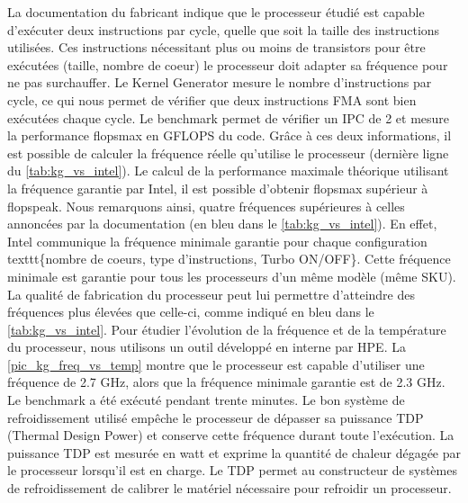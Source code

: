     

    
    La documentation du fabricant indique que le processeur étudié est capable d'exécuter deux instructions par cycle, quelle que soit la taille des instructions utilisées. Ces instructions nécessitant plus ou moins de transistors pour être exécutées (taille, nombre de coeur) le processeur doit adapter sa fréquence pour ne pas surchauffer.  Le Kernel Generator mesure le nombre d'instructions par cycle, ce qui nous permet de vérifier que deux instructions \gls{FMA} sont bien exécutées chaque cycle. Le benchmark permet de vérifier un \gls{IPC} de 2 et mesure la performance \gls{flopsmax} en GFLOPS du code. Grâce à ces deux informations, il est possible de calculer la fréquence réelle qu'utilise le processeur (dernière ligne du  \autoref{tab:kg_vs_intel}). Le calcul de la performance maximale théorique utilisant la fréquence garantie par Intel, il est possible d'obtenir \gls{flopsmax} supérieur à \gls{flopspeak}. Nous remarquons ainsi, quatre fréquences supérieures à celles annoncées par la documentation (en bleu dans le \autoref{tab:kg_vs_intel}). En effet, Intel communique la fréquence minimale garantie pour chaque configuration texttt{\{nombre de coeurs, type d'instructions, Turbo ON/OFF\}}. Cette fréquence minimale est garantie pour tous les processeurs d'un même modèle (même SKU). La qualité de fabrication du processeur peut lui permettre d'atteindre des fréquences plus élevées que celle-ci, comme indiqué en bleu dans le \autoref{tab:kg_vs_intel}. Pour étudier l'évolution de la fréquence et de la température du processeur, nous utilisons un outil développé en interne par HPE. La \autoref{pic_kg_freq_vs_temp} montre que le processeur est capable d'utiliser une fréquence de 2.7 GHz, alors que la fréquence minimale garantie est de 2.3 GHz. Le benchmark a été exécuté pendant trente minutes. Le bon système de refroidissement utilisé empêche le processeur de dépasser sa puissance TDP (Thermal Design Power) et conserve cette fréquence durant toute l'exécution. La puissance TDP est mesurée en watt et exprime la quantité de chaleur dégagée par le processeur lorsqu'il est en charge. Le TDP permet au constructeur de systèmes de refroidissement de calibrer le matériel nécessaire pour refroidir un processeur.  
    
